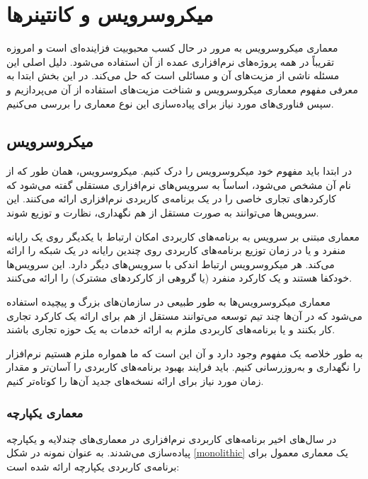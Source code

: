 \newpage

\section{میکروسرویس و کانتینرها}

معماری میکروسرویس به مرور در حال کسب محبوبیت فزاینده‌ای است و امروزه تقریباً در همه پروژه‌های نرم‌افزاری عمده از آن استفاده می‌شود. دلیل اصلی این مسئله ناشی از مزیت‌های آن و مسائلی است که حل می‌کند. در این بخش ابتدا به معرفی مفهوم معماری میکروسرویس و شناخت مزیت‌های استفاده از آن می‌پردازیم و سپس فناوری‌های مورد نیاز برای پیاده‌سازی این نوع معماری را بررسی می‌کنیم.

\subsection{میکروسرویس}

در ابتدا باید مفهوم خود میکروسرویس را درک کنیم. میکروسرویس، همان طور که از نام آن مشخص می‌شود، اساساً به سرویس‌های نرم‌افزاری مستقلی گفته می‌شود که کارکردهای تجاری خاصی را در یک برنامه‌ی کاربردی نرم‌افزاری ارائه می‌کنند. این سرویس‌ها می‌توانند به صورت مستقل از هم نگهداری، نظارت و توزیع شوند.

معماری مبتنی بر سرویس به برنامه‌های کاربردی‌ امکان ارتباط با یکدیگر روی یک رایانه منفرد و یا در زمان توزیع برنامه‌های کاربردی‌ روی چندین رایانه در یک شبکه را ارائه می‌کند. هر میکروسرویس ارتباط اندکی با سرویس‌های دیگر دارد. این سرویس‌ها خودکفا هستند و یک کارکرد منفرد (یا گروهی از کارکردهای مشترک) را ارائه می‌کنند.

معماری میکروسرویس‌ها به طور طبیعی در سازمان‌های بزرگ و پیچیده استفاده می‌شود که در آن‌ها چند تیم توسعه می‌توانند مستقل از هم برای ارائه یک کارکرد تجاری کار بکنند و یا برنامه‌های کاربردی‌ ملزم به ارائه خدمات به یک حوزه تجاری باشند.

به طور خلاصه یک مفهوم وجود دارد و آن این است که ما همواره ملزم هستیم نرم‌افزار را نگهداری و به‌روزرسانی کنیم. باید فرایند بهبود برنامه‌های کاربردی‌ را آسان‌تر و مقدار زمان مورد نیاز برای ارائه نسخه‌های جدید آن‌ها را کوتاه‌تر کنیم.

\subsubsection{معماری یکپارچه}

در سال‌های اخیر برنامه‌های کاربردی‌ نرم‌افزاری در معماری‌های چندلایه و یکپارچه پیاده‌سازی می‌شدند. به عنوان نمونه در شکل \ref{monolithic} یک معماری معمول برای برنامه‌ی کاربردی یکپارچه ارائه شده است:

